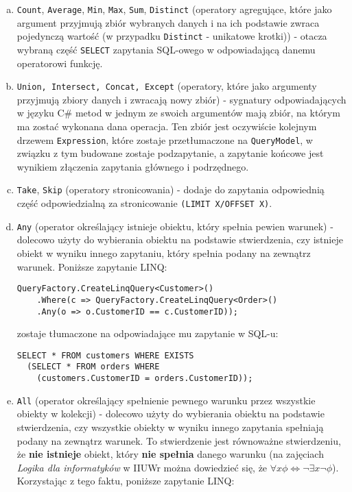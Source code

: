 \begin{enumerate}[a)]
\item \texttt{Count}, \texttt{Average}, \texttt{Min}, \texttt{Max}, \texttt{Sum}, \texttt{Distinct} (operatory agregujące, które jako argument przyjmują zbiór wybranych danych i na ich podstawie zwraca pojedynczą wartość (w przypadku \texttt{Distinct} - unikatowe krotki)) - otacza wybraną część \texttt{SELECT} zapytania SQL-owego w odpowiadającą danemu operatorowi funkcję.
\item \texttt{Union, Intersect, Concat, Except} (operatory, które jako argumenty przyjmują zbiory danych i zwracają nowy zbiór) - sygnatury odpowiadających w języku C\# metod w jednym ze swoich argumentów mają zbiór, na którym ma zostać wykonana dana operacja. Ten zbiór jest oczywiście kolejnym drzewem \texttt{Expression}, które zostaje przetłumaczone na \texttt{QueryModel}, w związku z tym budowane zostaje podzapytanie, a zapytanie końcowe jest wynikiem złączenia zapytania głównego i podrzędnego. 
\item \texttt{Take}, \texttt{Skip} (operatory stronicowania) - dodaje do zapytania odpowiednią część odpowiedzialną za stronicowanie \texttt{(LIMIT X/OFFSET X)}.
\item \texttt{Any} (operator określający istnieje obiektu, który spełnia pewien warunek) - dolecowo użyty do wybierania obiektu na podstawie stwierdzenia, czy istnieje obiekt w wyniku innego zapytaniu, który spełnia podany na zewnątrz warunek. Poniższe zapytanie LINQ:

\begin{lstlisting}
QueryFactory.CreateLinqQuery<Customer>()
    .Where(c => QueryFactory.CreateLinqQuery<Order>()
    .Any(o => o.CustomerID == c.CustomerID));
\end{lstlisting}

zostaje tłumaczone na odpowiadające mu zapytanie w SQL-u:

\begin{lstlisting}
SELECT * FROM customers WHERE EXISTS 
  (SELECT * FROM orders WHERE
    (customers.CustomerID = orders.CustomerID));
\end{lstlisting}

\item \texttt{All} (operator określający spełnienie pewnego warunku przez wszystkie obiekty w kolekcji) - dolecowo użyty do wybierania obiektu na podstawie stwierdzenia, czy wszystkie obiekty w wyniku innego zapytania spełniają podany na zewnątrz warunek. To stwierdzenie jest równoważne stwierdzeniu, że \textbf{nie istnieje} obiekt, który \textbf{nie spełnia} danego warunku (na zajęciach \textit{Logika dla informatyków} w IIUWr można dowiedzieć się, że $\forall x \phi \Leftrightarrow \neg \exists x \neg \phi$). Korzystając z tego faktu, poniższe zapytanie LINQ:


\end{enumerate}
